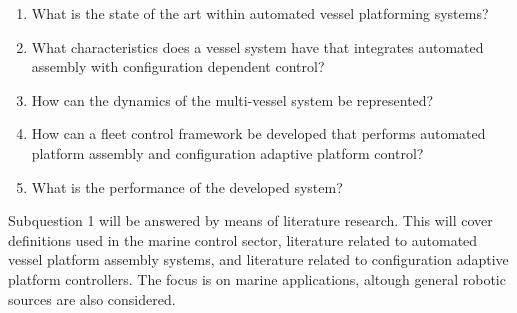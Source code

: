 \begin{enumerate}
\item What is the state of the art within automated vessel platforming systems?
\item What characteristics does a vessel system have that integrates automated assembly with configuration dependent control?
\item How can the dynamics of the multi-vessel system be represented?
\item How can a fleet control framework be developed that performs automated platform assembly and configuration adaptive platform control? 
\item What is the performance of the developed system?
\end{enumerate}

Subquestion 1 will be answered by means of literature research. This will cover definitions used in the marine control sector, literature related to automated vessel platform assembly systems, and literature related to configuration adaptive platform controllers. The focus is on marine applications, altough general robotic sources are also considered. 


